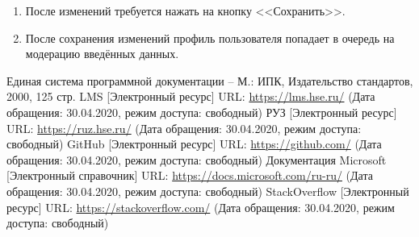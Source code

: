 \documentclass{../includes/TechDoc}
\begin{document}
\begin{enumerate}
        \item После изменений требуется нажать на кнопку <<Сохранить>>.
        \item После сохранения изменений профиль пользователя попадает в очередь на модерацию введённых данных.


    \end{enumerate}


    \begin{thebibliography}{3}
        Единая система программной документации – М.: ИПК, Издательство стандартов, 2000, 125 стр.
         LMS [Электронный ресурс] URL: \url{https://lms.hse.ru/} (Дата обращения: 30.04.2020, режим доступа: свободный)
         РУЗ [Электронный ресурс] URL: \url{https://ruz.hse.ru/} (Дата обращения: 30.04.2020, режим доступа: свободный)
         GitHub [Электронный ресурс] URL: \url{https://github.com/} (Дата обращения: 30.04.2020, режим доступа: свободный)
         Документация Microsoft [Электронный справочник] URL: \url{https://docs.microsoft.com/ru-ru/} (Дата обращения: 30.04.2020, режим доступа: свободный)
         StackOverflow [Электронный ресурс] URL: \url{https://stackoverflow.com/} (Дата обращения: 30.04.2020, режим доступа: свободный)
    \end{thebibliography}


    \registrationList
\end{document}
